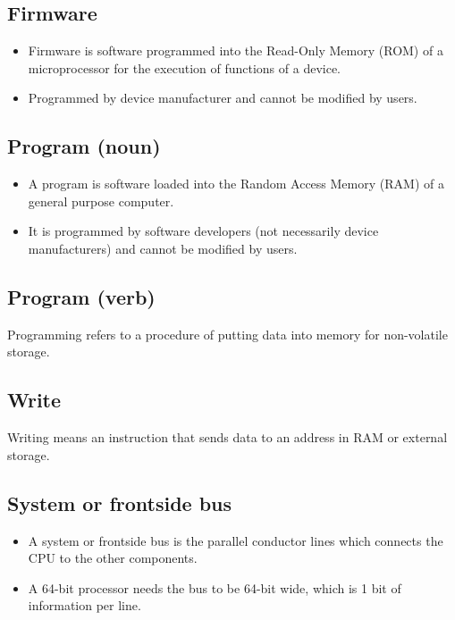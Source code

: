 \documentclass[11pt]{article}
\begin{document}
\subsection{Firmware}
\label{sec:orga328ded}
\begin{itemize}
\item Firmware is software programmed into the Read-Only Memory (ROM) of a microprocessor for the execution of functions of a device.
\item Programmed by device manufacturer and cannot be modified by users.
\end{itemize}

\subsection{Program (noun)}
\label{sec:org7ad4411}
\begin{itemize}
\item A program is software loaded into the Random Access Memory (RAM) of a general purpose computer.
\item It is programmed by software developers (not necessarily device manufacturers) and cannot be modified by users.
\end{itemize}

\subsection{Program (verb)}
\label{sec:orgf7ff45c}
Programming refers to a procedure of putting data into memory for non-volatile storage.

\subsection{Write}
\label{sec:org8f9f43e}
Writing means an instruction that sends data to an address in RAM or external storage.

\subsection{System or frontside bus}
\label{sec:org9af2e52}
\begin{itemize}
\item A system or frontside bus is the parallel conductor lines which connects the CPU to the other components.
\item A 64-bit processor needs the bus to be 64-bit wide, which is 1 bit of information per line.
\end{itemize}
\end{document}
